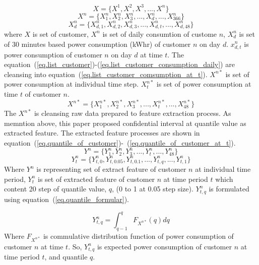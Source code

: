 \documentclass[conference]{IEEEtran}
\begin{document}
\begin{equation}
X=\big\{ X^{1}, X^{2}, X^{3}, ..., X^{n} \big\}
\label{eq.list_customer}
\end{equation}
\begin{equation}
X^{n}=\big\{ X_{1}^{n}, X_{2}^{n}, X_{3}^{n}, ...,X_{d}^{n},..., X_{366}^{n}\big\}
\label{eq.list_customer_consumption}
\end{equation}
\begin{equation}
X_{d}^{n}=\big\{ X_{d,1}^{n}, X_{d,2}^{n}, X_{d,3}^{n}, ...,X_{d,t}^{n},..., X_{d,48}^{n}\big\}
\label{eq.list_customer_consumption_daily}
\end{equation}
where $X$ is set of customer, $X^{n}$ is set of daily consumtion of custome $n$, $X_{d}^n$ is set of 30 minutes based power consumption (kWhr) of customer $n$ on day $d$. $x_{d,t}^{n}$ is power consumption of customer $n$ on day $d$ at time $t$.
The equation~(\ref{eq.list_customer})-(\ref{eq.list_customer_consumption_daily}) are cleansing into equation~(\ref{eq.list_customer_comsumption_at_t}).
$X^{n*}$ is set of power consumption at individual time step. $X_{t}^{n*}$ is set of power consumption at time $t$ of customer $n$.
\begin{equation}
X^{n*}=\big\{ X_{1}^{n*}, X_{2}^{n*}, X_{3}^{n*}, ..., X_{t}^{n*}, ..., X_{48}^{n*} \big\}
\label{eq.list_customer_comsumption_at_t}
\end{equation}
The $X^{n*}$ is cleansing raw data prepared to feature extraction process. As memntion above, this paper proposed confidential interval at quantile value as extracted feature. The extracted feature processes are shown in equation~(\ref{eq.quantile_of_customer})-~(\ref{eq.quantile_of_customer_at_t}).
\begin{equation}
  Y^{n}=\big\{ Y_{1}^{n}, Y_{2}^{n}, Y_{3}^{n}, ..., Y_{t}^{n}, ..., Y_{48}^{n} \big\}
  \label{eq.quantile_of_customer}
\end{equation}
\begin{equation}
  Y_{t}^{n}=\big\{ Y_{t,0}^{n}, Y_{t,0.05}^{n}, Y_{t,0.1}^{n}, ..., Y_{t,q}^{n}, ..., Y_{t,1}^{n} \big\}
  \label{eq.quantile_of_customer_at_t}
\end{equation}
Where $Y^{n}$ is representing set of extract feature of customer $n$ at individual time period, $Y_{t}^{n}$ is set of extracted feature of customer $n$ at time period $t$ which content 20 step of quantile value, $q$, (0 to 1 at 0.05 step size).
$Y_{t,q}^{n}$ is formulated using equation~(\ref{eq.quantile_formular}).

\begin{equation}
  Y_{t,q}^{n}=\int_{q-1}^{q} F_{X^{n*}}(q) dq
  \label{eq.quantile_formular}
\end{equation}
Where $F_{X^{n*}}$ is commulative distribution function of power consumption of customer $n$ at time $t$. So, $Y_{t,q}^{n}$ is expected power consumption of customer $n$ at time period $t$, and quantile $q$.
\end{document}
